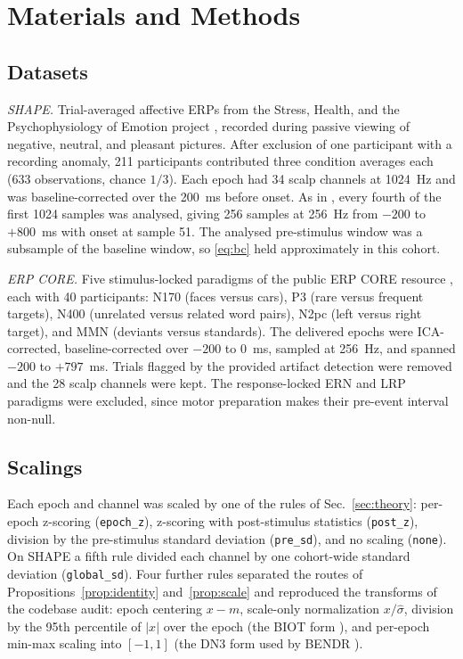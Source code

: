 \section{Materials and Methods}\label{sec:methods}

\subsection{Datasets}
\emph{SHAPE.} Trial-averaged affective ERPs from the Stress, Health, and the Psychophysiology of Emotion project \cite{shape}, recorded during passive viewing of negative, neutral, and pleasant pictures. After exclusion of one participant with a recording anomaly, 211 participants contributed three condition averages each (633 observations, chance $1/3$). Each epoch had 34 scalp channels at 1024~Hz and was baseline-corrected over the 200~ms before onset. As in \cite{lane2026bibm}, every fourth of the first 1024 samples was analysed, giving 256 samples at 256~Hz from $-200$ to $+800$~ms with onset at sample 51. The analysed pre-stimulus window was a subsample of the baseline window, so \eqref{eq:bc} held approximately in this cohort.

\emph{ERP CORE.} Five stimulus-locked paradigms of the public ERP CORE resource \cite{kappenman2021erpcore}, each with 40 participants: N170 (faces versus cars), P3 (rare versus frequent targets), N400 (unrelated versus related word pairs), N2pc (left versus right target), and MMN (deviants versus standards). The delivered epochs were ICA-corrected, baseline-corrected over $-200$ to $0$~ms, sampled at 256~Hz, and spanned $-200$ to $+797$~ms. Trials flagged by the provided artifact detection were removed and the 28 scalp channels were kept. The response-locked ERN and LRP paradigms were excluded, since motor preparation makes their pre-event interval non-null.

\subsection{Scalings}
Each epoch and channel was scaled by one of the rules of Sec.~\ref{sec:theory}: per-epoch z-scoring (\texttt{epoch\_z}), z-scoring with post-stimulus statistics (\texttt{post\_z}), division by the pre-stimulus standard deviation (\texttt{pre\_sd}), and no scaling (\texttt{none}). On SHAPE a fifth rule divided each channel by one cohort-wide standard deviation (\texttt{global\_sd}). Four further rules separated the routes of Propositions~\ref{prop:identity} and~\ref{prop:scale} and reproduced the transforms of the codebase audit: epoch centering $x-m$, scale-only normalization $x/\hat\sigma$, division by the 95th percentile of $|x|$ over the epoch (the BIOT form \cite{yang2023biot}), and per-epoch min-max scaling into $[-1,1]$ (the DN3 form used by BENDR \cite{kostas2021bendr}).

